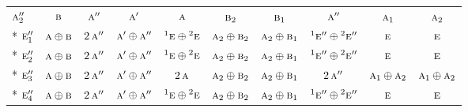 \documentclass[10pt,a4paper]{article}
\numberwithin{equation}{section}
\newcommand{\irr}[1]{\text{\normalfont\scshape #1}}
\newcommand{\conjpair}[1]{{}^{#1}}
\begin{document}
{\begin{longtable}{@{}lccccccccc@{}}
$\irr{a}_{2}''$ & $\irr{b}$ & $\irr{a}''$ & $\irr{a}'$ & $\irr{a}$ & $\irr{b}_{2}$ & $\irr{b}_{1}$ & $\irr{a}''$ & $\irr{a}_{1}$ & $\irr{a}_{2}$\\*
$\irr{e}_{1}''$ & $\irr{a}\oplus \irr{b}$ & $2\,\irr{a}''$ & $\irr{a}'\oplus \irr{a}''$ & $\conjpair{1}\irr{e}\oplus \conjpair{2}\irr{e}$ & $\irr{a}_{2}\oplus \irr{b}_{2}$ & $\irr{a}_{2}\oplus \irr{b}_{1}$ & $\conjpair{1}\irr{e}''\oplus \conjpair{2}\irr{e}''$ & $\irr{e}$ & $\irr{e}$\\*
$\irr{e}_{2}''$ & $\irr{a}\oplus \irr{b}$ & $2\,\irr{a}''$ & $\irr{a}'\oplus \irr{a}''$ & $\conjpair{1}\irr{e}\oplus \conjpair{2}\irr{e}$ & $\irr{a}_{2}\oplus \irr{b}_{2}$ & $\irr{a}_{2}\oplus \irr{b}_{1}$ & $\conjpair{1}\irr{e}''\oplus \conjpair{2}\irr{e}''$ & $\irr{e}$ & $\irr{e}$\\*
$\irr{e}_{3}''$ & $\irr{a}\oplus \irr{b}$ & $2\,\irr{a}''$ & $\irr{a}'\oplus \irr{a}''$ & $2\,\irr{a}$ & $\irr{a}_{2}\oplus \irr{b}_{2}$ & $\irr{a}_{2}\oplus \irr{b}_{1}$ & $2\,\irr{a}''$ & $\irr{a}_{1}\oplus \irr{a}_{2}$ & $\irr{a}_{1}\oplus \irr{a}_{2}$\\*
$\irr{e}_{4}''$ & $\irr{a}\oplus \irr{b}$ & $2\,\irr{a}''$ & $\irr{a}'\oplus \irr{a}''$ & $\conjpair{1}\irr{e}\oplus \conjpair{2}\irr{e}$ & $\irr{a}_{2}\oplus \irr{b}_{2}$ & $\irr{a}_{2}\oplus \irr{b}_{1}$ & $\conjpair{1}\irr{e}''\oplus \conjpair{2}\irr{e}''$ & $\irr{e}$ & $\irr{e}$\\
\bottomrule\end{longtable}}
\end{document}
